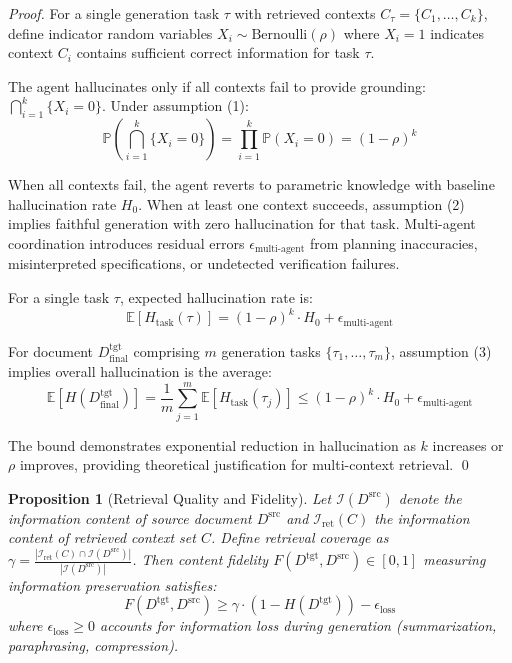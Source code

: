 \documentclass{ieeeaccess}
\newtheorem{proposition}[theorem]{Proposition}
\begin{document}
\begin{proof}
For a single generation task \(\tau\) with retrieved contexts \(C_\tau = \{C_1, \ldots, C_k\}\), define indicator random variables \(X_i \sim \text{Bernoulli}(\rho)\) where \(X_i = 1\) indicates context \(C_i\) contains sufficient correct information for task \(\tau\).

The agent hallucinates only if all contexts fail to provide grounding: \(\bigcap_{i=1}^k \{X_i = 0\}\). Under assumption (1):
\begin{equation}
\mathbb{P}\left(\bigcap_{i=1}^k \{X_i = 0\}\right) = \prod_{i=1}^k \mathbb{P}(X_i = 0) = (1-\rho)^k
\end{equation}

When all contexts fail, the agent reverts to parametric knowledge with baseline hallucination rate \(H_0\). When at least one context succeeds, assumption (2) implies faithful generation with zero hallucination for that task. Multi-agent coordination introduces residual errors \(\epsilon_{\text{multi-agent}}\) from planning inaccuracies, misinterpreted specifications, or undetected verification failures.

For a single task \(\tau\), expected hallucination rate is:
\begin{equation}
\mathbb{E}[H_{\text{task}}(\tau)] = (1-\rho)^k \cdot H_0 + \epsilon_{\text{multi-agent}}
\end{equation}

For document \(D^{\text{tgt}}_{\text{final}}\) comprising \(m\) generation tasks \(\{\tau_1, \ldots, \tau_m\}\), assumption (3) implies overall hallucination is the average:
\begin{equation}
\mathbb{E}[H(D^{\text{tgt}}_{\text{final}})] = \frac{1}{m} \sum_{j=1}^m \mathbb{E}[H_{\text{task}}(\tau_j)] \leq (1-\rho)^k \cdot H_0 + \epsilon_{\text{multi-agent}}
\end{equation}

The bound demonstrates exponential reduction in hallucination as \(k\) increases or \(\rho\) improves, providing theoretical justification for multi-context retrieval. \qed
\end{proof}

\begin{proposition}[Retrieval Quality and Fidelity]
\label{prop:fidelity}
Let \(\mathcal{I}(D^{\text{src}})\) denote the information content of source document \(D^{\text{src}}\) and \(\mathcal{I}_{\text{ret}}(C)\) the information content of retrieved context set \(C\). Define retrieval coverage as \(\gamma = \frac{|\mathcal{I}_{\text{ret}}(C) \cap \mathcal{I}(D^{\text{src}})|}{|\mathcal{I}(D^{\text{src}})|}\). Then content fidelity \(F(D^{\text{tgt}}, D^{\text{src}}) \in [0,1]\) measuring information preservation satisfies:
\begin{equation}
F(D^{\text{tgt}}, D^{\text{src}}) \geq \gamma \cdot (1 - H(D^{\text{tgt}})) - \epsilon_{\text{loss}}
\label{eq:fidelity-bound}
\end{equation}
where \(\epsilon_{\text{loss}} \geq 0\) accounts for information loss during generation (summarization, paraphrasing, compression).
\end{proposition}
\end{document}
